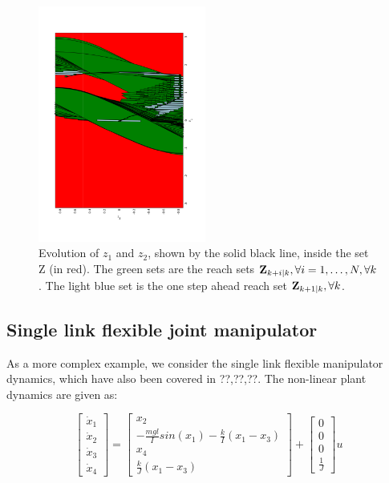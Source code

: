 \begin{figure}
\includegraphics[angle=270,width=0.49\textwidth]{figs/z_trajectory_new.pdf}
\caption{Evolution of $z_1$ and $z_2$, shown by the solid black line, inside the set Z (in red). The green sets are the reach sets $\mathbf{Z}_{k+i|k},\forall i=1,\dotsc,N, \forall k$. The light blue set is the one step ahead reach set $\mathbf{Z}_{k+1|k},\forall k$.}
\label{fig:z_new_toy}
\end{figure}




\subsection{Single link flexible joint manipulator}

As a more complex example, we consider the single link flexible manipulator dynamics, which have also been covered in ??,??,??. The non-linear plant dynamics are given as:

\begin{equation}
\begin{bmatrix} \dot{x}_1 \\ \dot{x}_2 \\ \dot{x}_3 \\ \dot{x}_4    \end{bmatrix} = \begin{bmatrix} x_2 \\ -\frac{mgl}{I}sin(x_1) - \frac{k}{I}(x_1-x_3)  \\ x_4 \\ \frac{k}{J}(x_1-x_3)  \end{bmatrix} + \begin{bmatrix} 0 \\ 0 \\ 0 \\ \frac{1}{J} \end{bmatrix}u
\end{equation}

